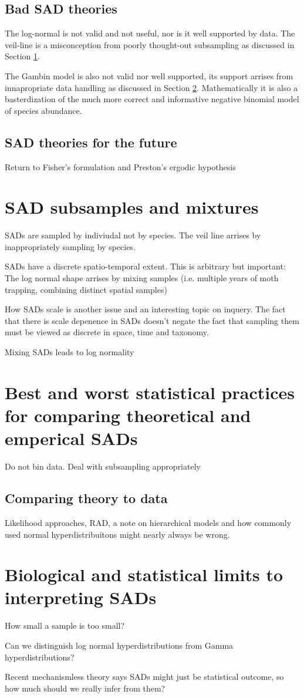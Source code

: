 \documentclass[12pt]{article}
\begin{document}
\subsection{Bad SAD theories}
The log-normal is not valid and not useful, nor is it well supported
by data. The veil-line is a misconception from poorly thought-out
subsampling as discussed in Section \ref{sec:samp}.

The Gambin model is also not valid nor well supported, its support
arrises from innapropriate data handling as discussed in Section
\ref{sec:statPrac}. Mathematically it is also a basterdization of the
much more correct and informative negative binomial model of species
abundance.

\subsection{SAD theories for the future}
Return to Fisher's formulation and Preston's ergodic hypothesis


\section{SAD subsamples and mixtures}
\label{sec:samp}

SADs are sampled by indiviudal not by species. The veil line arrises
by inappropriately sampling by species.

SADs have a discrete spatio-temporal extent. This is arbitrary but
important: The log normal shape arrises by mixing samples
(i.e. multiple years of moth trapping, combining distinct spatial
samples)

How SADs scale is another issue and an interesting topic on inquery.
The fact that there is scale depenence in SADs doesn't negate the fact
that sampling them must be viewed as discrete in space, time and
taxonomy.

Mixing SADs leads to log normality

\section{Best and worst statistical practices for comparing
  theoretical and emperical SADs}
\label{sec:statPrac}

Do not bin data. Deal with subsampling appropriately

\subsection{Comparing theory to data}
Likelihood approaches, RAD, a note on hierarchical models and how
commonly used normal hyperdistribuitons might nearly always be wrong.

\section{Biological and statistical limits to interpreting SADs}

How small a sample is too small?

Can we distinguish log normal hyperdistributions from Gamma
hyperdistributions?

Recent mechanismless theory says SADs might just be statistical
outcome, so how much should we really infer from them?
\end{document}
